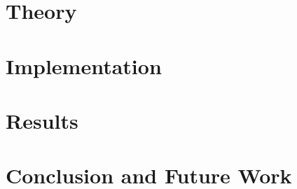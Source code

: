 \documentclass[12pt,letterpaper]{report}
\begin{document}
\chapter {Theory}



\chapter{Implementation}




\chapter{Results}







\chapter{Conclusion and Future Work}  







{\singlespace

}
\renewcommand{\chaptername}{APPENDIX}
\appendix

\biographicalpage{}

\end{document}
